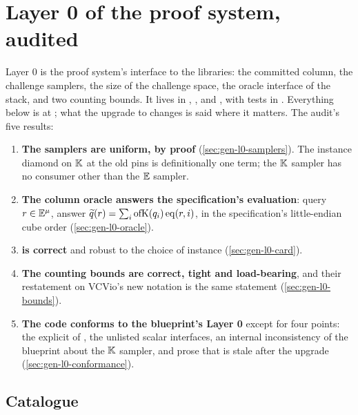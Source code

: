 \begingroup\sloppy
\section{Layer 0 of the proof system, audited}\label{sec:gen-l0}

Layer 0 is the proof system's interface to the libraries: the committed column, the challenge
samplers, the size of the challenge space, the oracle interface of the stack, and two counting
bounds. It lives in \allowbreak{}\allowbreak{}, ,
\allowbreak{} and \allowbreak{}, with tests in
\allowbreak{}\allowbreak{}\allowbreak{}. Everything below is at ; what the
upgrade to  changes is said where it matters. The audit's five results:
\begin{enumerate}
\item \textbf{The samplers are uniform, by proof} (\cref{sec:gen-l0-samplers}). The instance
  diamond on $\mathbb{K}$ at the old pins is definitionally one term; the $\mathbb{K}$ sampler has no consumer
  other than the $\mathbb{E}$ sampler.
\item \textbf{The column oracle answers the specification's evaluation}: query $r \in \mathbb{E}^{\mu}$,
  answer $\widetilde{q}(r) = \sum_i \mathrm{ofK}(q_i)\,\mathrm{eq}(r,i)$, in the specification's little-endian
  cube order (\cref{sec:gen-l0-oracle}).
\item \textbf{ is correct} and robust to the choice of instance
  (\cref{sec:gen-l0-card}).
\item \textbf{The counting bounds are correct, tight and load-bearing}, and their restatement on
  VCVio's new notation is the same statement (\cref{sec:gen-l0-bounds}).
\item \textbf{The code conforms to the blueprint's Layer 0} except for four points: the explicit
   of , the unlisted scalar interfaces, an internal inconsistency
  of the blueprint about the $\mathbb{K}$ sampler, and prose that is stale after the upgrade
  (\cref{sec:gen-l0-conformance}).
\end{enumerate}

\subsection{Catalogue}\label{sec:gen-l0-catalogue}

